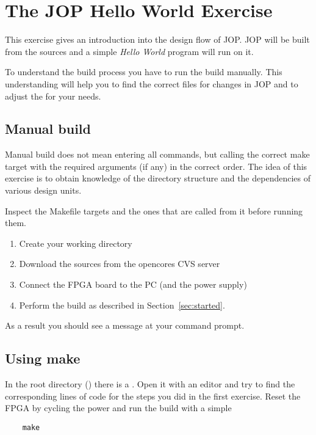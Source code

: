 \section{The JOP Hello World Exercise}

This exercise gives an introduction into the design flow of JOP. JOP
will be built from the sources and a simple \emph{Hello World}
program will run on it.

To understand the build process you have to run the build manually.
This understanding will help you to find the correct files for
changes in JOP and to adjust the  for your needs.

\subsection{Manual build}

Manual build does not mean entering all commands, but calling the
correct make target with the required arguments (if any) in the
correct order. The idea of this exercise is to obtain knowledge of
the directory structure and the dependencies of various design units.

Inspect the Makefile targets and the ones that are called from it
before running them.

\begin{enumerate}
    \item Create your working directory
    \item Download the sources from the opencores CVS server
    \item Connect the FPGA board to the PC (and the power supply)
    \item Perform the build as described in
        Section~\ref{sec:started}.
\end{enumerate}

As a result you should see a message at your command prompt.

\subsection{Using make}

In the root directory () there is a . Open
it with an editor and try to find the corresponding lines of code for
the steps you did in the first exercise. Reset the FPGA by cycling
the power and run the build with a simple
\begin{verbatim}
    make
\end{verbatim}

